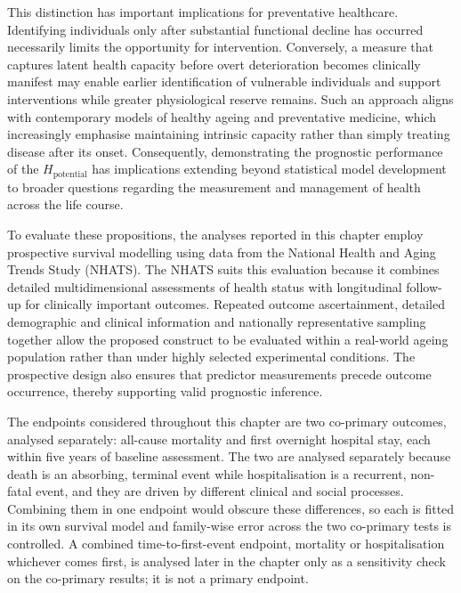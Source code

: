 This distinction has important implications for preventative healthcare. Identifying individuals only after substantial functional decline has occurred necessarily limits the opportunity for intervention. Conversely, a measure that captures latent health capacity before overt deterioration becomes clinically manifest may enable earlier identification of vulnerable individuals and support interventions while greater physiological reserve remains. Such an approach aligns with contemporary models of healthy ageing and preventative medicine, which increasingly emphasise maintaining intrinsic capacity \citep{who_2015_ageing,cesari_2018} rather than simply treating disease after its onset. Consequently, demonstrating the prognostic performance of the $H_{\text{potential}}$ has implications extending beyond statistical model development to broader questions regarding the measurement and management of health across the life course.

To evaluate these propositions, the analyses reported in this chapter employ prospective survival modelling using data from the National Health and Aging Trends Study (NHATS). The NHATS suits this evaluation because it combines detailed multidimensional assessments of health status with longitudinal follow-up for clinically important outcomes. Repeated outcome ascertainment, detailed demographic and clinical information and nationally representative sampling together allow the proposed construct to be evaluated within a real-world ageing population rather than under highly selected experimental conditions. The prospective design also ensures that predictor measurements precede outcome occurrence, thereby supporting valid prognostic inference.

The endpoints considered throughout this chapter are two co-primary outcomes, analysed separately: all-cause mortality and first overnight hospital stay, each within five years of baseline assessment. The two are analysed separately because death is an absorbing, terminal event while hospitalisation is a recurrent, non-fatal event, and they are driven by different clinical and social processes. Combining them in one endpoint would obscure these differences, so each is fitted in its own survival model and family-wise error across the two co-primary tests is controlled. A combined time-to-first-event endpoint, mortality or hospitalisation whichever comes first, is analysed later in the chapter only as a sensitivity check on the co-primary results; it is not a primary endpoint.

